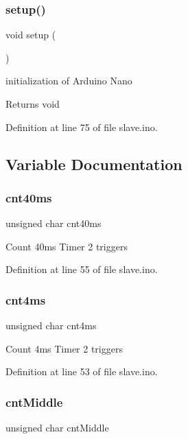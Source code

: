\subsubsection{\texorpdfstring{setup()}{setup()}}
{\footnotesize\ttfamily void setup (\begin{DoxyParamCaption}{ }\end{DoxyParamCaption})}



initialization of Arduino Nano 

\begin{DoxyReturn}{Returns}
void 
\end{DoxyReturn}


Definition at line 75 of file slave.\+ino.



\subsection{Variable Documentation}
\mbox{\label{slave_8ino_ae5706ef178bfd4a28331580ac6775816}} 
\subsubsection{\texorpdfstring{cnt40ms}{cnt40ms}}
{\footnotesize\ttfamily unsigned char cnt40ms}

Count 40ms Timer 2 triggers 

Definition at line 55 of file slave.\+ino.

\mbox{\label{slave_8ino_ac5d1ffdf8d27a1d426758f404490cf9f}} 
\subsubsection{\texorpdfstring{cnt4ms}{cnt4ms}}
{\footnotesize\ttfamily unsigned char cnt4ms}

Count 4ms Timer 2 triggers 

Definition at line 53 of file slave.\+ino.

\mbox{\label{slave_8ino_a74b7512e5d4ca1d133f9179dc3a52474}} 
\subsubsection{\texorpdfstring{cntMiddle}{cntMiddle}}
{\footnotesize\ttfamily unsigned char cnt\+Middle}


